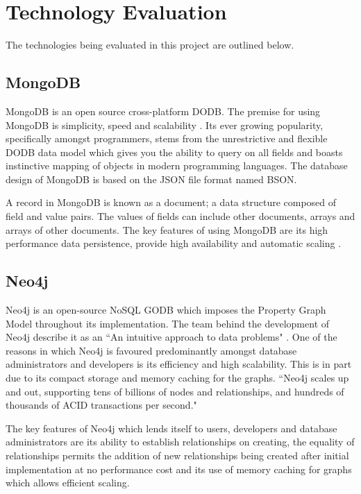 \section{Technology Evaluation}\label{techeval}
The technologies being evaluated in this project are outlined below.

\subsection{MongoDB}\label{mongo}
MongoDB is an open source cross-platform DODB. The premise for using MongoDB is simplicity, speed and scalability  \cite{md}. Its ever growing popularity, specifically amongst programmers, stems from the unrestrictive and flexible DODB data model which gives you the ability to query on all fields and boasts instinctive mapping of objects in modern programming languages. \cite{md} The database design of MongoDB is based on the JSON file format named BSON. 

A record in MongoDB is known as a document; a data structure composed of field and value pairs. The values of fields can include other documents, arrays and arrays of other documents. The key features of using MongoDB are its high performance data persistence, provide high availability and automatic scaling  \cite{md}.

\subsection{Neo4j}\label{neo}
Neo4j is an open-source NoSQL GODB which imposes the Property Graph Model throughout its implementation. The team behind the development of Neo4j describe it as an ``An intuitive approach to data problems" \cite{ndweb}. One of the reasons in which Neo4j is favoured predominantly amongst database administrators and developers is its efficiency and high scalability. This is in part due to its compact storage and memory caching for the graphs. ``Neo4j scales up and out, supporting tens of billions of nodes and relationships, and hundreds of thousands of ACID transactions per second." \cite{ndweb}

The key features of Neo4j which lends itself to users, developers and database administrators are its ability to establish relationships on creating, the equality of relationships permits the addition of new relationships being created after initial implementation at no performance cost and its use of memory caching for graphs which allows efficient scaling.

